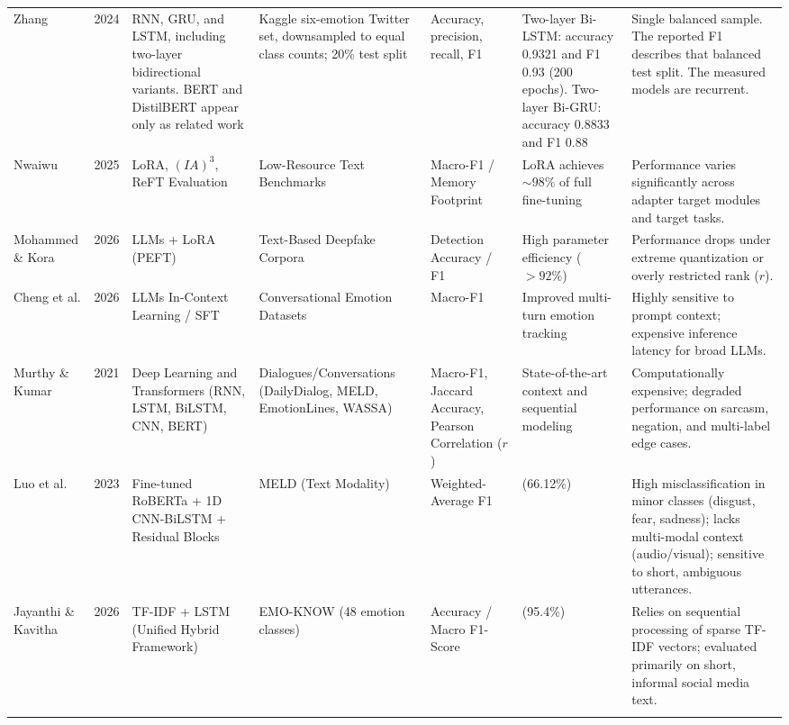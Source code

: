 \documentclass[conference]{IEEEtran}
\begin{document}
\begin{table}[t]
\begin{tabularx}{\textwidth}{@{} >{\hsize=0.85\hsize}X c >{\hsize=1.05\hsize}X >{\hsize=1.0\hsize}X >{\hsize=0.85\hsize}X >{\hsize=1.05\hsize}X >{\hsize=1.2\hsize}X @{}}
Zhang \cite{zhang2024comparative} & 2024 & RNN, GRU, and LSTM, including two-layer bidirectional variants. BERT and DistilBERT appear only as related work & Kaggle six-emotion Twitter set, downsampled to equal class counts; 20\% test split & Accuracy, precision, recall, F1 & Two-layer Bi-LSTM: accuracy 0.9321 and F1 0.93 (200 epochs). Two-layer Bi-GRU: accuracy 0.8833 and F1 0.88 & Single balanced sample. The reported F1 describes that balanced test split. The measured models are recurrent. \\
\addlinespace

Nwaiwu \cite{nwaiwu2025peft} & 2025 & LoRA, $(IA)^3$, ReFT Evaluation & Low-Resource Text Benchmarks & Macro-F1 / Memory Footprint & LoRA achieves $\sim 98\%$ of full fine-tuning & Performance varies significantly across adapter target modules and target tasks. \\
\addlinespace

Mohammed \& Kora \cite{mohammed2026deepfake} & 2026 & LLMs + LoRA (PEFT) & Text-Based Deepfake Corpora & Detection Accuracy / F1 & High parameter efficiency ($>92\%$) & Performance drops under extreme quantization or overly restricted rank ($r$). \\
\addlinespace

Cheng et al. \cite{cheng2026personality} & 2026 & LLMs In-Context Learning / SFT & Conversational Emotion Datasets & Macro-F1 & Improved multi-turn emotion tracking & Highly sensitive to prompt context; expensive inference latency for broad LLMs. \\
\addlinespace

Murthy \& Kumar \cite{murthy2021review} & 2021 & Deep Learning and Transformers (RNN, LSTM, BiLSTM, CNN, BERT) & Dialogues/Conversations (DailyDialog, MELD, EmotionLines, WASSA) & Macro-F1, Jaccard Accuracy, Pearson Correlation ($r$) & State-of-the-art context and sequential modeling & Computationally expensive; degraded performance on sarcasm, negation, and multi-label edge cases. \\
\addlinespace

Luo et al. \cite{luo23_interspeech} & 2023 & Fine-tuned RoBERTa + 1D CNN-BiLSTM + Residual Blocks & MELD (Text Modality) & Weighted-Average F1 & 0.6612 (66.12\%) & High misclassification in minor classes (disgust, fear, sadness); lacks multi-modal context (audio/visual); sensitive to short, ambiguous utterances. \\
\addlinespace

Jayanthi \& Kavitha \cite{Jayanthi_Kavitha_2026} & 2026 & TF-IDF + LSTM (Unified Hybrid Framework) & EMO-KNOW (48 emotion classes) & Accuracy / Macro F1-Score & 0.954 (95.4\%) & Relies on sequential processing of sparse TF-IDF vectors; evaluated primarily on short, informal social media text. \\
\addlinespace


\end{tabularx}
\end{table}
\end{document}
